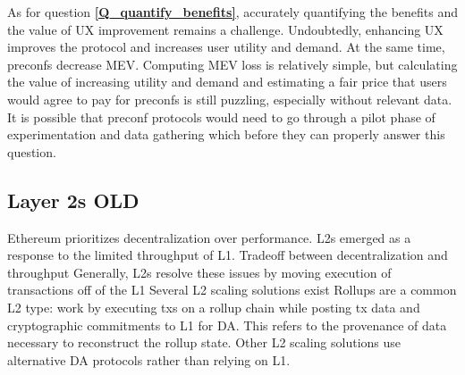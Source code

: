 \documentclass[a4paper]{article}
\theoremstyle{boldstyle}
\newtheorem{openquestionx}{Open Question}
\newenvironment{openquestion}
  {\begin{openboxq}\begin{openquestionx}}
  {\end{openquestionx}\end{openboxq}}
\newcommand{\open}[1]{\textcolor{green}{\textbf{open:} #1}}
\begin{document}
    As for question \textbf{\ref{Q_quantify_benefits}}, accurately quantifying the benefits and the value of UX improvement remains a challenge. Undoubtedly, enhancing UX improves the protocol and increases user utility and demand. At the same time, preconfs decrease MEV. Computing MEV loss is relatively simple, but calculating the value of increasing utility and demand and estimating a fair price that users would agree to pay for preconfs is still puzzling, especially without relevant data. It is possible that preconf protocols would need to go through a pilot phase of experimentation and data gathering which before they can properly answer this question.

    \subsection{Layer 2s OLD}
    Ethereum prioritizes decentralization over performance. 
    L2s emerged as a response to the limited throughput of L1.
    Tradeoff between decentralization and throughput \cite{TheLimitstoBlockchainScalability}
    Generally, L2s resolve these issues by moving execution of transactions off of the L1 
    Several L2 scaling solutions exist
    Rollups are a common L2 type: work by executing txs on a rollup chain while posting tx data and cryptographic commitments to L1 for DA. 
    This refers to the provenance of data necessary to reconstruct the rollup state. Other L2 scaling solutions use alternative DA protocols rather than relying on L1. \\
    
\end{document}

